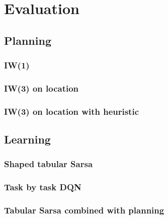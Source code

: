 \chapter{Evaluation}
\section{Planning}
\subsection{\acl{IW}(1)}
\subsection{\acl{IW}(3) on location}
\subsection{\acl{IW}(3) on location with heuristic}
\section{Learning}
\subsection{Shaped tabular Sarsa}
\subsection{Task by task \acs{DQN}}
\subsection{Tabular Sarsa combined with planning}


